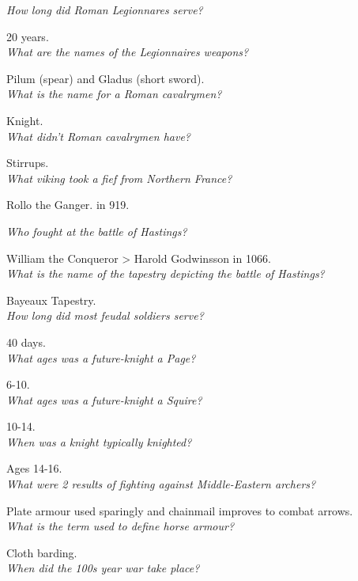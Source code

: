 \documentclass[12pt]{article}
\begin{document}
\textit{How long did Roman Legionnares serve?}

20 years.\\

\textit{What are the names of the Legionnaires weapons?}

Pilum (spear) and Gladus (short sword).\\

\textit{What is the name for a Roman cavalrymen?}

Knight.\\

\textit{What didn't Roman cavalrymen have?}

Stirrups.\\

\textit{What viking took a fief from Northern France?}

Rollo the Ganger. in 919.

\textit{Who fought at the battle of Hastings?}

William the Conqueror > Harold Godwinsson in 1066.\\

\textit{What is the name of the tapestry depicting the battle of Hastings?}

Bayeaux Tapestry.\\

\textit{How long did most feudal soldiers serve?}

40 days.\\

\textit{What ages was a future-knight a Page?}

6-10.\\

\textit{What ages was a future-knight a Squire?}

10-14.\\

\textit{When was a knight typically knighted?}

Ages 14-16.\\

\textit{What were 2 results of fighting against Middle-Eastern archers?}

Plate armour used sparingly and chainmail improves to combat arrows.\\

\textit{What is the term used to define horse armour?}

Cloth barding.\\

\textit{When did the 100s year war take place?}
\end{document}
